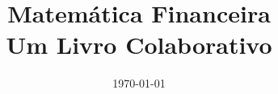 \documentclass[twoside,11pt]{book}
\title{Matemática Financeira\\\small{Um Livro Colaborativo}}
\date{\today}
\author{}
\theoremstyle{plain}  %
\theoremstyle{remark}  %
\theoremstyle{definition}  %
\newcommand\summaryname{abstract}
\newenvironment{abstract}%
    {\small\begin{center}%
    \bfseries{\summaryname} \end{center}}
\begin{document}
\iflatexml
\begin{abstract}
  Este livro busca abordar os tópicos de um curso moderno de Matemática Financeira.
\end{abstract}
\fi


\maketitle

\mainmatter






\iflatexml

\begin{lxFooter}
  Licença CC BY-SA 3.0 http://creativecommons.org/licenses/by-sa/3.0/
\end{lxFooter}
\fi

\mainmatter
 


\clearpage
\appendix
%

\iflatexml
\else
 
\fi


\nocite{*}





\backmatter

\printindex
\end{document}
